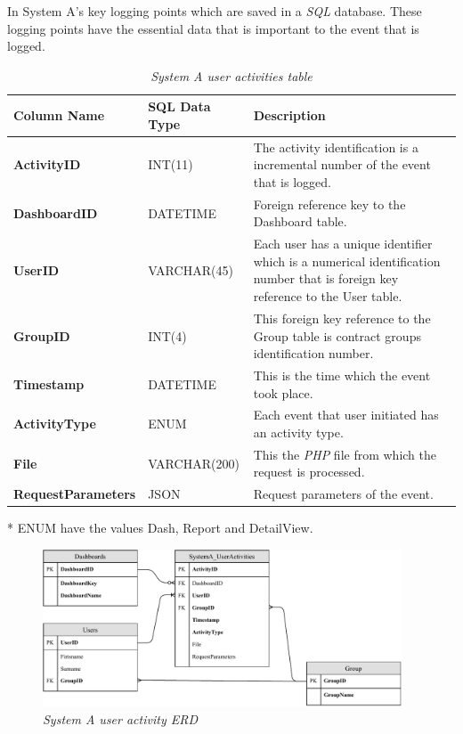 In  System A's key logging points which are saved in a \emph{SQL} database. These logging points have the essential data that is important to the event that is logged.

\begin{table}[!htb]
	\centering
	\small
	\caption[Logging points]
	{\textit{System A user activities table}}
	\label{tbl:Ch2_PHP_LoggignMechanism}
	\begin{threeparttable}
		\begin{tabularx}{\textwidth}{|l|l|X|}
			\hline \textbf{Column Name} & \textbf{SQL Data Type} & \textbf{Description} \\
			\hline \textbf{ActivityID} & INT(11) & The activity identification is a incremental number of the event that is logged.\\
			\hline \textbf{DashboardID} & DATETIME & Foreign reference key to the Dashboard table.\\
			\hline \textbf{UserID} & VARCHAR(45) & Each user has a unique identifier which is a numerical identification number that is foreign key reference to the User table.\\
			\hline \textbf{GroupID} & INT(4) & This foreign key reference to the Group table is contract groups identification number. \\ 
			\hline \textbf{Timestamp} & DATETIME & This is the time which the event took place.\\			
			\hline \textbf{ActivityType} & ENUM\tnote{*} & Each event that user initiated has an activity type. \\
			\hline \textbf{File} & VARCHAR(200) & This the \emph{PHP} file from which the request is processed.\\
			\hline \textbf{RequestParameters} & JSON & Request parameters of the event. \\
			\hline
		\end{tabularx}
		\begin{tablenotes}
			\item[*] ENUM have the values Dash, Report and DetailView.
		\end{tablenotes}
	\end{threeparttable}
\end{table}

\begin{figure}[!htb] %
	\centering %
	\includegraphics[width=0.95\textwidth]{Images/Chapter2/SystemA_ERD_Basic/SystemA_ERD_Basic.pdf}
	\caption[System A user activity ERD]
	{\textit{System A user activity ERD}}\label{fig:SystemA_Basic_ERD}
\end{figure}


